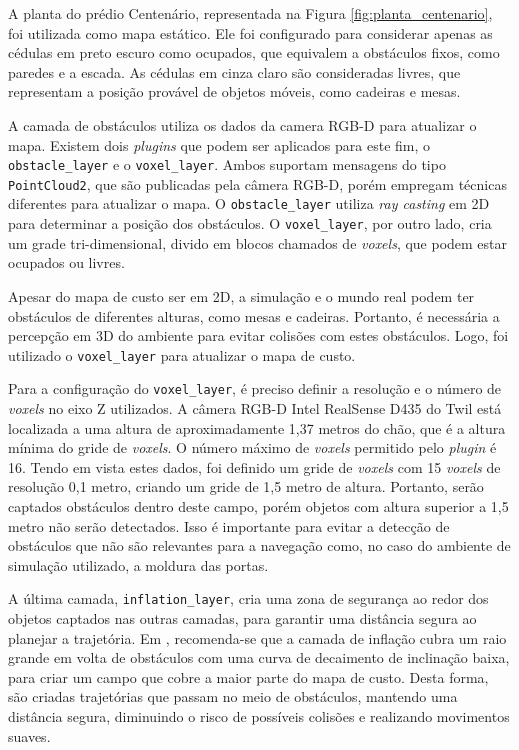 \documentclass[repeatfields,xlists,xpacks,oneside,yearsonly]{ufrgscca}
\begin{document}
A planta do prédio Centenário, representada na Figura
\ref{fig:planta_centenario}, foi utilizada como mapa estático. Ele
foi configurado para considerar apenas as cédulas em preto escuro
como ocupados, que equivalem a obstáculos fixos, como paredes e a
escada. As cédulas em cinza claro são consideradas livres, que
representam a posição provável de objetos móveis, como cadeiras e
mesas.

A camada de obstáculos utiliza os dados da camera RGB-D para
atualizar o mapa. Existem dois \textit{plugins} que podem ser
aplicados para este fim, o \texttt{obstacle\_layer} e o
\texttt{voxel\_layer}. Ambos suportam mensagens do tipo
\texttt{PointCloud2}, que são publicadas pela câmera RGB-D, porém
empregam técnicas diferentes para atualizar o mapa.  O \texttt{obstacle\_layer} utiliza
\textit{ray casting} em 2D para determinar a posição dos obstáculos.
O \texttt{voxel\_layer}, por outro lado, cria um grade
tri-dimensional, divido em blocos chamados de \textit{voxels}, que
podem estar ocupados ou livres.

Apesar do mapa de custo ser em 2D, a simulação e o mundo real podem
ter obstáculos de diferentes alturas, como mesas e cadeiras.
Portanto, é necessária a percepção em 3D do ambiente para evitar
colisões com estes obstáculos. Logo, foi utilizado o
\texttt{voxel\_layer} para atualizar o mapa de custo.

Para a configuração do \texttt{voxel\_layer}, é preciso definir a
resolução e o número de \textit{voxels} no eixo Z utilizados. A
câmera RGB-D Intel RealSense D435 do Twil está localizada a uma
altura de aproximadamente 1,37 metros do chão, que é a altura mínima
do gride de \textit{voxels}. O número máximo de \textit{voxels}
permitido pelo \textit{plugin} é 16. Tendo em vista estes dados, foi
definido um gride de \textit{voxels} com 15 \textit{voxels} de
resolução 0,1 metro, criando um gride de 1,5 metro de altura.
Portanto, serão captados obstáculos dentro deste campo, porém objetos
com altura superior a 1,5 metro não serão detectados. Isso é
importante para evitar a detecção de obstáculos que não são
relevantes para a navegação como, no caso do ambiente de simulação
utilizado, a moldura das portas.

A última camada, \texttt{inflation\_layer}, cria uma zona de
segurança ao redor dos objetos captados nas outras camadas, para
garantir uma distância segura ao planejar a trajetória. Em
\textcite{ros_tuning_guide}, recomenda-se que a camada de inflação
cubra um raio grande em volta de obstáculos com uma curva de
decaimento de inclinação baixa, para criar um campo que cobre a maior
parte do mapa de custo. Desta forma, são criadas trajetórias que
passam no meio de obstáculos, mantendo uma distância segura,
diminuindo o risco de possíveis colisões e realizando movimentos
suaves.
\end{document}
